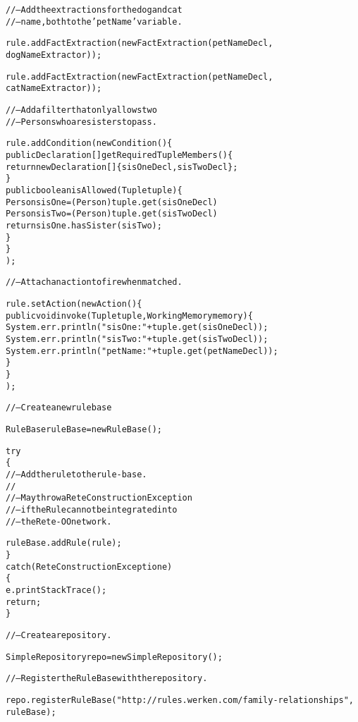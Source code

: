 \begin{alltt}
// -- Add the extractions for the dog and cat
// -- name, both to the 'petName' variable.

rule.addFactExtraction( new FactExtraction( petNameDecl,
                                            dogNameExtractor ) );

rule.addFactExtraction( new FactExtraction( petNameDecl,
                                            catNameExtractor ) );

// -- Add a filter that only allows two
// -- Persons who are sisters to pass.

rule.addCondition( new Condition() \{
        public Declaration[] getRequiredTupleMembers() \{
            return new Declaration[] \{ sisOneDecl, sisTwoDecl \};
        \}
        public boolean isAllowed(Tuple tuple) \{
            Person sisOne = (Person) tuple.get( sisOneDecl ) 
            Person sisTwo = (Person) tuple.get( sisTwoDecl ) 
            return sisOne.hasSister( sisTwo )	;
        \} 
    \}
      );

\newpage

// -- Attach an action to fire when matched.

rule.setAction( new Action() \{
        public void invoke(Tuple tuple, WorkingMemory memory) \{
            System.err.println( "sisOne: " + tuple.get( sisOneDecl ) );
            System.err.println( "sisTwo: " + tuple.get( sisTwoDecl ) );
            System.err.println( "petName: " + tuple.get( petNameDecl ) );
        \}
    \}
      );

// -- Create a new rule base

RuleBase ruleBase = new RuleBase();

try
\{
    // -- Add the rule to the rule-base.
    // 
    // -- May throw a ReteConstructionException 
    // -- if the Rule cannot be integrated into
    // -- the Rete-OO network.

    ruleBase.addRule( rule );
\}
catch (ReteConstructionException e)
\{
    e.printStackTrace();
    return;
\}

// -- Create a repository.

SimpleRepository repo = new SimpleRepository();

// -- Register the RuleBase with the repository.
	
repo.registerRuleBase( "http://rules.werken.com/family-relationships",
                       ruleBase );

\end{alltt}
\normalsize

\newpage
